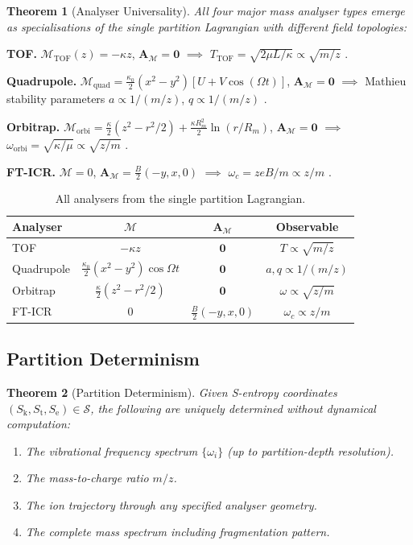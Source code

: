 \documentclass[11pt,twocolumn,a4paper]{article}
\newtheorem{theorem}{Theorem}[section]
\theoremstyle{definition}
\theoremstyle{remark}
\newcommand{\Sk}{S_{\mathrm{k}}}
\newcommand{\St}{S_{\mathrm{t}}}
\newcommand{\Se}{S_{\mathrm{e}}}
\newcommand{\Sspace}{\mathcal{S}}
\newcommand{\Depth}{\mathcal{M}}
\newcommand{\partinert}{\mu}
\newcommand{\Apartition}{\mathbf{A}_{\mathcal{M}}}
\begin{document}
\begin{theorem}[Analyser Universality]
\label{thm:analyzers}
All four major mass analyser types emerge as specialisations of the single partition Lagrangian with different field topologies:
\end{theorem}

\textbf{TOF.} $\Depth_{\mathrm{TOF}}(z) = -\kappa z$, $\Apartition = \mathbf{0}$ $\implies$ $T_{\mathrm{TOF}} = \sqrt{2\partinert L/\kappa} \propto \sqrt{m/z}$ \citep{wiley1955}.

\textbf{Quadrupole.} $\Depth_{\mathrm{quad}} = \frac{\kappa_0}{2}(x^2-y^2)[U + V\cos(\Omega t)]$, $\Apartition = \mathbf{0}$ $\implies$ Mathieu stability parameters $a \propto 1/(m/z)$, $q \propto 1/(m/z)$ \citep{paul1990, march2005}.

\textbf{Orbitrap.} $\Depth_{\mathrm{orbi}} = \frac{\kappa}{2}(z^2 - r^2/2) + \frac{\kappa R_m^2}{2}\ln(r/R_m)$, $\Apartition = \mathbf{0}$ $\implies$ $\omega_{\mathrm{orbi}} = \sqrt{\kappa/\partinert} \propto \sqrt{z/m}$ \citep{makarov2000}.

\textbf{FT-ICR.} $\Depth = 0$, $\Apartition = \frac{B}{2}(-y,x,0)$ $\implies$ $\omega_c = zeB/m \propto z/m$ \citep{marshall1998}.

\begin{table}[H]
\centering
\caption{All analysers from the single partition Lagrangian.}
\label{tab:analyzers}
\small
\begin{tabular}{lccc}
\toprule
\textbf{Analyser} & \textbf{$\Depth$} & \textbf{$\Apartition$} & \textbf{Observable} \\
\midrule
TOF & $-\kappa z$ & $\mathbf{0}$ & $T \propto \sqrt{m/z}$ \\
Quadrupole & $\frac{\kappa_0}{2}(x^2-y^2)\cos\Omega t$ & $\mathbf{0}$ & $a,q \propto 1/(m/z)$ \\
Orbitrap & $\frac{\kappa}{2}(z^2-r^2/2)$ & $\mathbf{0}$ & $\omega \propto \sqrt{z/m}$ \\
FT-ICR & $0$ & $\frac{B}{2}(-y,x,0)$ & $\omega_c \propto z/m$ \\
\bottomrule
\end{tabular}
\end{table}

\subsection{Partition Determinism}

\begin{theorem}[Partition Determinism]
\label{thm:determinism}
Given S-entropy coordinates $(\Sk, \St, \Se) \in \Sspace$, the following are uniquely determined without dynamical computation:
\begin{enumerate}[nosep]
\item The vibrational frequency spectrum $\{\omega_i\}$ (up to partition-depth resolution).
\item The mass-to-charge ratio $m/z$.
\item The ion trajectory through any specified analyser geometry.
\item The complete mass spectrum including fragmentation pattern.
\end{enumerate}
\end{theorem}
\end{document}
